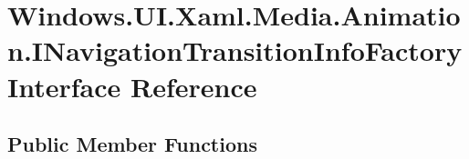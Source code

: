 \hypertarget{interface_windows_1_1_u_i_1_1_xaml_1_1_media_1_1_animation_1_1_i_navigation_transition_info_factory}{}\section{Windows.\+U\+I.\+Xaml.\+Media.\+Animation.\+I\+Navigation\+Transition\+Info\+Factory Interface Reference}
\label{interface_windows_1_1_u_i_1_1_xaml_1_1_media_1_1_animation_1_1_i_navigation_transition_info_factory}
\subsection*{Public Member Functions}
